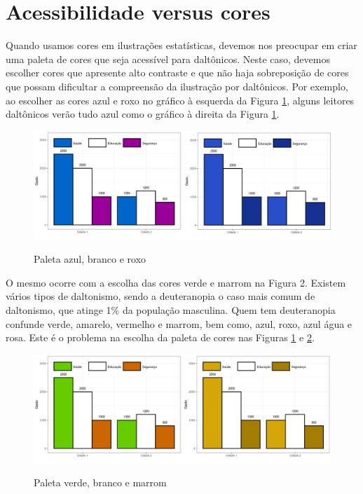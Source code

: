 \documentclass[12pt]{article}   %
\begin{document}
\section{Acessibilidade versus cores}

Quando usamos cores em ilustrações estatísticas, devemos nos preocupar em criar
uma paleta de cores que seja acessível para daltônicos. Neste caso, devemos
escolher cores que apresente alto contraste e que não haja sobreposição de cores
que possam dificultar a compreensão da ilustração por daltônicos. Por exemplo,
ao escolher as cores azul e roxo no gráfico à esquerda da Figura
\ref{fig_paleta_azul_branco_roxo}, alguns leitores daltônicos verão tudo azul
como o gráfico à direita da Figura \ref{fig_paleta_azul_branco_roxo}.

\begin{figure}[h!]
    \centering
    \caption{Paleta azul, branco e roxo}
    \includegraphics[scale=0.3]{AzulRoxo}
    \label{fig_paleta_azul_branco_roxo}
\end{figure}

O mesmo ocorre com a escolha das cores verde e marrom na Figura 2. Existem
vários tipos de daltonismo, sendo a deuteranopia o caso mais comum de
daltonismo, que atinge 1\% da população masculina. Quem tem deuteranopia
confunde verde, amarelo, vermelho e marrom, bem como, azul, roxo, azul água e
rosa. Este é o problema na escolha da paleta de cores nas Figuras
\ref{fig_paleta_azul_branco_roxo} e \ref{fig_verde_branco_marrom}.

\begin{figure}[h!]
    \centering
    \caption{Paleta verde, branco e marrom}
    \includegraphics[scale=0.3]{VerdeMarrom}
    \label{fig_verde_branco_marrom}
\end{figure}
\end{document}
